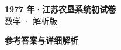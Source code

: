 \documentclass[zihao=-4, a4paper]{ctexart}
\begin{document}
\begin{center}
  {\Large\bfseries 1977 年·江苏农垦系统初试卷}\\[4pt]
  {\large 数学 · 解析版}
\end{center}
\medskip
{}

\clearpage
{}
\begin{center}{\Large\bfseries 参考答案与详细解析}\end{center}
\medskip

\end{document}
